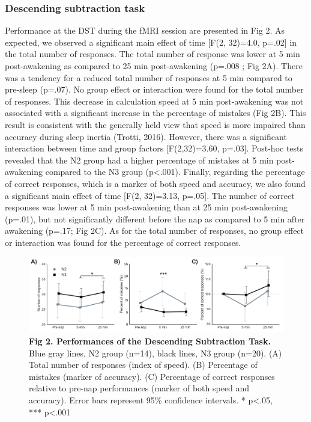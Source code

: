 \subsubsection*{Descending subtraction task}
Performance at the DST during the fMRI session are presented in Fig 2. As expected, we observed a significant main effect of time [F(2, 32)=4.0, p=.02] in the total number of responses. The total number of response was lower at 5 min post-awakening as compared to 25 min post-awakening (p=.008 ; Fig 2A). There was a tendency for a reduced total number of responses at 5 min compared to pre-sleep (p=.07). No group effect or interaction were found for the total number of responses. This decrease in calculation speed at 5 min post-awakening was not associated with a significant increase in the percentage of mistakes (Fig 2B). This result is consistent with the generally held view that speed is more impaired than accuracy during sleep inertia (Trotti, 2016). However, there was a significant interaction between time and group factors [F(2,32)=3.60, p=.03]. Post-hoc tests revealed that the N2 group had a higher percentage of mistakes at 5 min post-awakening compared to the N3 group (p<.001). Finally, regarding the percentage of correct responses, which is a marker of both speed and accuracy, we also found a significant main effect of time [F(2, 32)=3.13, p=.05]. The number of correct responses was lower at 5 min post-awakening than at 25 min post-awakening (p=.01), but not significantly different before the nap as compared to 5 min after awakening (p=.17; Fig 2C). As for the total number of responses, no group effect or interaction was found for the percentage of correct responses.

\begin{figure}[htbp]
	\includegraphics[width=\textwidth]{Fig/Results/Inertia/Inertia/Fig2_DST.png}
	\caption*{\textbf{Fig 2. Performances of the Descending Subtraction Task.} Blue gray lines, N2 group (n=14), black lines, N3 group (n=20). (A) Total number of responses (index of speed). (B) Percentage of mistakes (marker of accuracy). (C) Percentage of correct responses relative to pre-nap performances (marker of both speed and accuracy). Error bars represent 95\% confidence intervals. * p<.05, *** p<.001}
\end{figure}

